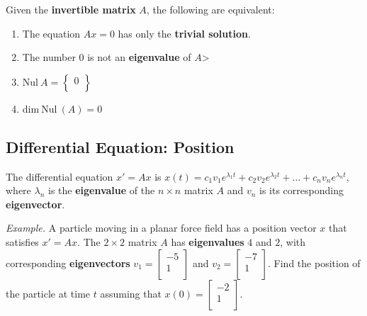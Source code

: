 \documentclass[12pt, letterpaper]{article}
\begin{document}
  Given the \textbf{invertible matrix} $ A $, the following are equivalent:

  \begin{enumerate}
    \item The equation $ Ax = 0 $ has only the \textbf{trivial solution}.
    \item The number $ 0 $ is not an \textbf{eigenvalue} of $ A $>
    \item $ \textrm{Nul} \: A =
      \begin{Bmatrix}
        0 \\
      \end{Bmatrix} $
    \item $ \textrm{dim} \: \textrm{Nul} \: (A) = 0 $
  \end{enumerate}

  \subsection*{Differential Equation: Position}

  The differential equation $ x' = Ax $ is $ \displaystyle x(t) =
  c_1v_1e^{\lambda_1t} + c_2v_2e^{\lambda_2t} + \hdots +
  c_nv_ne^{\lambda_nt} $, where $ \lambda_n $ is the
  \textbf{eigenvalue} of the $ n \times n $ matrix $ A $ and $ v_n $
  is its corresponding \textbf{eigenvector}.

  \bigskip

  \textit{Example.} A particle moving in a planar force field has a
  position vector $ x $ that satisfies $ x' = Ax $. The $ 2 \times 2
  $ matrix $ A $ has \textbf{eigenvalues} $ 4 $ and $ 2 $, with
  corresponding \textbf{eigenvectors} $ v_1 =
  \begin{bmatrix}
    -5 \\
    1 \\
  \end{bmatrix} $ and $ v_2 =
  \begin{bmatrix}
    -7 \\
    1 \\
  \end{bmatrix} $. Find the position of the particle at time $ t $
  assuming that $ x(0) =
  \begin{bmatrix}
    -2 \\
    1 \\
  \end{bmatrix} $.
\end{document}
